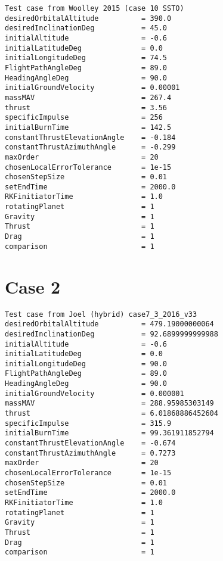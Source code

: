 \begin{lstlisting}
Test case from Woolley 2015 (case 10 SSTO)
desiredOrbitalAltitude 			= 390.0
desiredInclinationDeg 			= 45.0
initialAltitude 				= -0.6
initialLatitudeDeg 				= 0.0
initialLongitudeDeg				= 74.5
FlightPathAngleDeg 				= 89.0
HeadingAngleDeg 				= 90.0
initialGroundVelocity 			= 0.00001
massMAV 						= 267.4
thrust 							= 3.56
specificImpulse 				= 256
initialBurnTime 				= 142.5
constantThrustElevationAngle	= -0.184
constantThrustAzimuthAngle		= -0.299
maxOrder 						= 20
chosenLocalErrorTolerance 		= 1e-15
chosenStepSize 					= 0.01
setEndTime 						= 2000.0
RKFinitiatorTime 				= 1.0
rotatingPlanet 					= 1
Gravity 						= 1
Thrust 							= 1
Drag 							= 1
comparison 						= 1

\end{lstlisting}

\pagebreak

\section{Case 2}
\label{sec:case2}

\begin{lstlisting}
Test case from Joel (hybrid) case7_3_2016_v33
desiredOrbitalAltitude 			= 479.19000000064
desiredInclinationDeg 			= 92.6899999999988
initialAltitude 				= -0.6
initialLatitudeDeg 				= 0.0
initialLongitudeDeg 			= 90.0
FlightPathAngleDeg 				= 89.0
HeadingAngleDeg 				= 90.0
initialGroundVelocity 			= 0.000001
massMAV 						= 288.95985303149
thrust 							= 6.01868886452604
specificImpulse 				= 315.9
initialBurnTime 				= 99.361911852794
constantThrustElevationAngle	= -0.674
constantThrustAzimuthAngle		= 0.7273
maxOrder 						= 20
chosenLocalErrorTolerance 		= 1e-15
chosenStepSize					= 0.01
setEndTime 						= 2000.0
RKFinitiatorTime 				= 1.0
rotatingPlanet 					= 1
Gravity 						= 1
Thrust 							= 1
Drag 							= 1
comparison 						= 1

\end{lstlisting}

